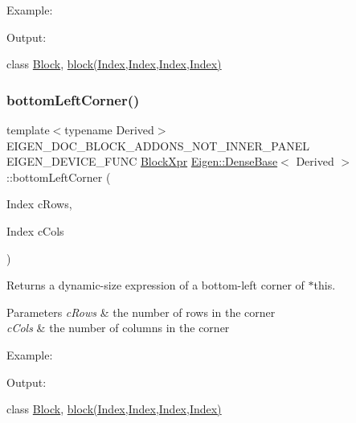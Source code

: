 Example\+: 
\begin{DoxyCodeInclude}{0}
\end{DoxyCodeInclude}
 Output\+: 
\begin{DoxyVerbInclude}
\end{DoxyVerbInclude}
 class \mbox{\hyperlink{class_eigen_1_1_block}{Block}}, \mbox{\hyperlink{class_eigen_1_1_dense_base_ab8e42e67c5cfd5fa13e684642f0f65bf}{block(\+Index,\+Index,\+Index,\+Index)}} \mbox{\label{class_eigen_1_1_dense_base_a3e7f36548fb49d9e9feac8d563af4ccd}} 
\subsubsection{\texorpdfstring{bottomLeftCorner()}{bottomLeftCorner()}\hspace{0.1cm}{\footnotesize\ttfamily [1/3]}}
{\footnotesize\ttfamily template$<$typename Derived$>$ \\
E\+I\+G\+E\+N\+\_\+\+D\+O\+C\+\_\+\+B\+L\+O\+C\+K\+\_\+\+A\+D\+D\+O\+N\+S\+\_\+\+N\+O\+T\+\_\+\+I\+N\+N\+E\+R\+\_\+\+P\+A\+N\+EL E\+I\+G\+E\+N\+\_\+\+D\+E\+V\+I\+C\+E\+\_\+\+F\+U\+NC \mbox{\hyperlink{class_eigen_1_1_block}{Block\+Xpr}} \mbox{\hyperlink{class_eigen_1_1_dense_base}{Eigen\+::\+Dense\+Base}}$<$ Derived $>$\+::bottom\+Left\+Corner (\begin{DoxyParamCaption}\item[{Index}]{c\+Rows,  }\item[{Index}]{c\+Cols }\end{DoxyParamCaption})\hspace{0.3cm}{\ttfamily [inline]}}

\begin{DoxyReturn}{Returns}
a dynamic-\/size expression of a bottom-\/left corner of $\ast$this.
\end{DoxyReturn}

\begin{DoxyParams}{Parameters}
{\em c\+Rows} & the number of rows in the corner \\
\hline
{\em c\+Cols} & the number of columns in the corner\\
\hline
\end{DoxyParams}
Example\+: 
\begin{DoxyCodeInclude}{0}
\end{DoxyCodeInclude}
 Output\+: 
\begin{DoxyVerbInclude}
\end{DoxyVerbInclude}
 class \mbox{\hyperlink{class_eigen_1_1_block}{Block}}, \mbox{\hyperlink{class_eigen_1_1_dense_base_ab8e42e67c5cfd5fa13e684642f0f65bf}{block(\+Index,\+Index,\+Index,\+Index)}} \mbox{\label{class_eigen_1_1_dense_base_a35eade54f5223ddb652c2057ab26b94c}} 
